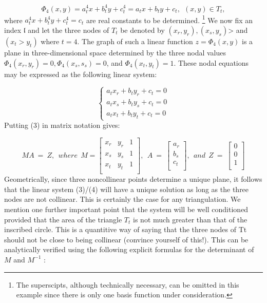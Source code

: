 \documentclass[../main.tex]{subfiles}
\begin{document}
\begin{equation}
\Phi_4(x,y)=a_t^4x+b_t^4y+c_t^4=a_tx+b_ty+c_t,~~(x,y) \in T_t,
\end{equation}
where $a_t^4x+b_t^4y+c_t^4=c_t$ are real constants to be determined.
\footnote{The superscipts, although technically necessary, can be omitted in this example since there is only one 
basis function under consideration. }
We now fix an index $\mathfrak{l}$ and let the three nodes of $T_t$ be denoted by $(x_r,y_r), (x_s,y_s)$> and $(x_t>y_t)$ where $t = 4$. The graph of such a linear function $z = \Phi_4(x,y)$ is a plane in three-dimensional space determined by the three nodal values $\Phi_4(x_r ,y_r ) = 0, \Phi_4(x_s,s_s) = 0$, and $\Phi_4(x_t,y_t) = 1$. These nodal equations may be expressed as the following linear system: 

\begin{equation}
	\begin{cases}
		a_t x_r+b_t y_r+c_t=0\\
		a_t x_s+b_t y_s+c_t=0\\
		a_t x_t+b_t y_t+c_t=0
	\end{cases}
\end{equation}
Putting (3) in matrix notation gives:


\begin{equation}
MA~=~Z, ~~where~~M=
	\begin{bmatrix} 
		  x_r&y_r&1\\
		  x_s&y_s&1\\
		  x_t&y_t&1\\	 
	\end{bmatrix},~~
	A~=~
	\begin{bmatrix} 
		  a_r\\
		  b_s\\
		  c_t\\	 
	\end{bmatrix},~~ and~~Z~=~
	\begin{bmatrix} 
		  0\\
		  0\\
		  1\\	 
	\end{bmatrix}
\end{equation}
Geometrically, since three noncollinear points determine a unique plane, it follows that the linear system (3)/(4) will have a unique solution as long as the three nodes are not collinear. This is certainly the case for any triangulation. We mention one further important point that the system will be well conditioned provided that the area of the triangle $T_t$ is not much greater than that of the inscribed circle. This is a quantitive way of saying that the three nodes of Tt should not be close to being collinear (convince yourself of this!). This can be analytically verified using the following explicit formulas for the determinant of $M$ and $M^{-1}$ : 
\end{document}
